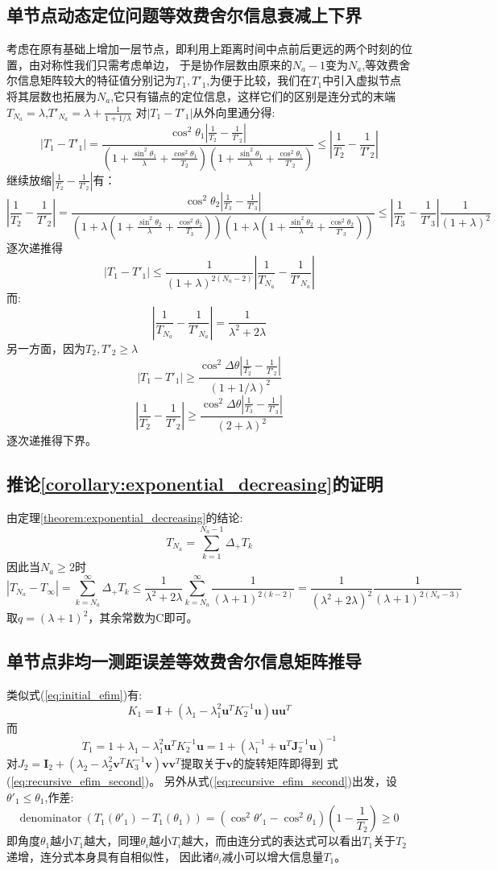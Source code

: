 \subsection{单节点动态定位问题等效费舍尔信息衰减上下界}\label{B_F_2}
考虑在原有基础上增加一层节点，即利用上距离时间中点前后更远的两个时刻的位置，由对称性我们只需考虑单边，
于是协作层数由原来的$N_a-1$变为$N_a$,等效费舍尔信息矩阵较大的特征值分别记为$T_1,T'_1$,为便于比较，我们在$T_1$中引入虚拟节点将其层数也拓展为$N_a$,它只有锚点的定位信息，这样它们的区别是连分式的末端$T_{N_a}=\lambda$,$T'_{N_a}=\lambda+\frac{1}{1+1/\lambda}$
对$|T_1-T'_1|$从外向里通分得:
\[
|T_1-T'_1|=\frac{\cos^2\theta_1|\frac{1}{T_2}-\frac{1}{T'_2}|}{(1+\frac{\sin^2\theta_1}{\lambda}+\frac{\cos^2\theta_1}{T_2})
(1+\frac{\sin^2\theta_1}{\lambda}+\frac{\cos^2\theta_1}{T'_2})}\leq |\frac{1}{T_2}-\frac{1}{T'_2}|
\]
继续放缩$|\frac{1}{T_2}-\frac{1}{T'_2}|$有：
\[
|\frac{1}{T_2}-\frac{1}{T'_2}|= \frac{\cos^2\theta_2|\frac{1}{T_3}-\frac{1}{T'_3}|}{(1+\lambda(1+\frac{\sin^2\theta_2}{\lambda}+\frac{\cos^2\theta_2}{T_3}))
(1+\lambda(1+\frac{\sin^2\theta_2}{\lambda}+\frac{\cos^2\theta_2}{T'_3}))}\leq |\frac{1}{T_3}-\frac{1}{T'_3}|\frac{1}{(1+\lambda)^2}
\]
逐次递推得
\[
|T_1-T'_1|\leq \frac{1}{(1+\lambda)^{2(N_a-2)}} |\frac{1}{T_{N_a}}-\frac{1}{T'_{N_a}}|
\]
而:
\[
|\frac{1}{T_{N_a}}-\frac{1}{T'_{N_a}}|=\frac{1}{\lambda^2+2\lambda}
\]
另一方面，因为$T_2,T'_2\geq \lambda$
\[
|T_1-T'_1|\geq \frac{\cos^2\Delta\theta|\frac{1}{T_2}-\frac{1}{T'_2}|}{(1+1/\lambda)^2}
\]
\[
|\frac{1}{T_2}-\frac{1}{T'_2}|\geq \frac{\cos^2\Delta\theta|\frac{1}{T_3}-\frac{1}{T'_3}|}{(2+\lambda)^2}
\]
逐次递推得下界。
\subsection{推论\ref{corollary:exponential_decreasing}的证明}\label{B_F_5}
由定理\ref{theorem:exponential_decreasing}的结论:
\[
T_{N_a}=\sum_{k=1}^{N_a-1}\Delta_{+}T_k
\]
因此当$N_a\geq 2$时
\[
|T_{N_a}-T_{\infty}|=\sum_{k=N_a}^{\infty}\Delta_{+}T_k\leq \frac{1}{\lambda^2+2\lambda}\sum_{k=N_a}^{\infty}\frac{1}{(\lambda+1)^{2(k-2)}}=\frac{1}{(\lambda^2+2\lambda)^2}\frac{1}{(\lambda+1)^{2(N_a-3)}}
\]
取$q=(\lambda+1)^2$，其余常数为C即可。
\subsection{单节点非均一测距误差等效费舍尔信息矩阵推导}\label{B_F_3}
类似式(\ref{eq:initial_efim})有:
\[
K_1=\bm{I}+(\lambda_1-\lambda_1^2 \bm{u}^T K_2^{-1}\bm{u})\bm{u}\bm{u}^T
\]
而
\[
T_1=1+\lambda_1-\lambda_1^2 \bm{u}^T K_2^{-1}\bm{u}=1+(\lambda_1^{-1}+\bm{u}^T\bm{J}_2^{-1}\bm{u})^{-1}
\]
对$J_2=\bm{I}_2+(\lambda_2-\lambda_2^2\bm{v}^T K_3^{-1}\bm{v})\bm{v}\bm{v}^T$提取关于$\bm{v}$的旋转矩阵即得到
式(\ref{eq:recursive_efim_second})。
另外从式(\ref{eq:recursive_efim_second})出发，设$\theta'_1\leq \theta_1$,作差:
\[
\text{denominator}~(T_1(\theta'_1)-T_1(\theta_1))=(\cos^2\theta'_1-\cos^2\theta_1)(1-\frac{1}{T_2})\geq 0
\]
即角度$\theta_1$越小$T_1$越大，同理$\theta_i$越小$T_i$越大，而由连分式的表达式可以看出$T_1$关于$T_2$递增，连分式本身具有自相似性，
因此诸$\theta_i$减小可以增大信息量$T_1$。
